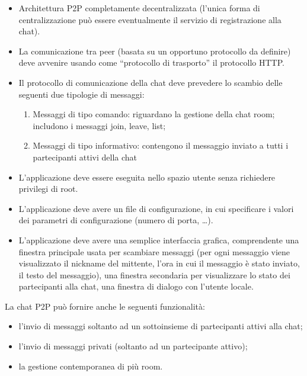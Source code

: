 \begin{itemize}
\item Architettura P2P completamente decentralizzata (l’unica forma di centralizzazione può essere eventualmente il servizio di registrazione alla chat).
\item La comunicazione tra peer (basata su un opportuno protocollo da definire) deve avvenire usando come “protocollo di trasporto” il protocollo HTTP.
\item Il protocollo di comunicazione della chat deve prevedere lo scambio delle seguenti due tipologie di messaggi:
\begin{enumerate}
\item Messaggi di tipo comando: riguardano la gestione della chat room; includono i messaggi join, leave, list;
\item Messaggi di tipo informativo: contengono il messaggio inviato a tutti i partecipanti attivi della chat
\end{enumerate}
\item L’applicazione deve essere eseguita nello spazio utente senza richiedere privilegi di root.
\item L’applicazione deve avere un file di configurazione, in cui specificare i valori dei parametri di configurazione (numero di porta, …).
\item L’applicazione deve avere una semplice interfaccia grafica, comprendente una finestra principale usata per scambiare messaggi (per ogni messaggio viene visualizzato il nickname del mittente, l’ora in cui il messaggio è stato inviato, il testo del messaggio), una finestra secondaria per visualizzare lo stato dei partecipanti alla chat, una finestra di dialogo con l’utente locale.
\end{itemize}
La chat P2P può fornire anche le seguenti funzionalità:
\begin{itemize}
\item l’invio di messaggi soltanto ad un sottoinsieme di partecipanti attivi alla chat;
\item l’invio di messaggi privati (soltanto ad un partecipante attivo);
\item la gestione contemporanea di più room.
\end{itemize}
